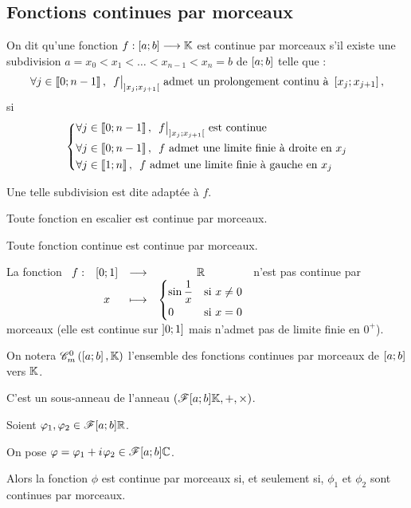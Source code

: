 \subsection{Fonctions continues par morceaux}

\begin{defi}
On dit qu'une fonction \(f:\left[a;b\right]\longrightarrow\mathbb{K}\) est continue par morceaux s'il existe une subdivision \(a=x_0<x_1<\dots<x_{n-1}<x_n=b\) de \(\left[a;b\right]\) telle que : \[\quantifs{\forall j\in\interventierii{0}{n-1}}\restr{f}{\intervee{x_j}{x_{j+1}}}\text{ admet un prolongement continu à }\intervii{x_j}{x_{j+1}},\] \cad si \[\begin{dcases}\quantifs{\forall j\in\interventierii{0}{n-1}}\restr{f}{\intervee{x_j}{x_{j+1}}}\text{ est continue} \\ \quantifs{\forall j\in\interventierii{0}{n-1}}f\text{ admet une limite finie à droite en }x_j \\ \quantifs{\forall j\in\interventierii{1}{n}}f\text{ admet une limite finie à gauche en }x_j\end{dcases}\]

Une telle subdivision est dite adaptée à \(f\).
\end{defi}

\begin{ex}
Toute fonction en escalier est continue par morceaux.

Toute fonction continue est continue par morceaux.

La fonction \(\begin{array}[t]{cccc}f : & \left[0;1\right] & \longrightarrow & \mathbb{R} \\ & x & \longmapsto & \begin{dcases}\sin\dfrac{1}{x} &\text{si }x\not=0 \\ 0 &\text{si }x=0\end{dcases}\end{array}\) n'est pas continue par morceaux (elle est continue sur \(\left]0;1\right]\) mais n'admet pas de limite finie en \(0^+\)).
\end{ex}

\begin{nota}
On notera \(\contm\) l'ensemble des fonctions continues par morceaux de \(\left[a;b\right]\) vers \(\mathbb{K}\).

C'est un sous-anneau de l'anneau \(\anneau{\F{\intervii{a}{b}}{\K}}\).
\end{nota}

\begin{rem}
Soient \(\varphi_1,\varphi_2\in\mathscr{F}{\left[a;b\right]}{\mathbb{R}}\).

On pose \(\varphi=\varphi_1+i\mkern1mu\varphi_2\in\mathscr{F}{\left[a;b\right]}{\mathbb{C}}\).

Alors la fonction \(\phi\) est continue par morceaux si, et seulement si, \(\phi_1\) et \(\phi_2\) sont continues par morceaux.
\end{rem}

